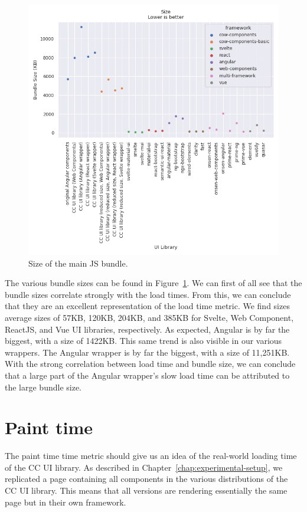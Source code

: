 \begin{figure}[h]
  \includegraphics[width=\columnwidth]{plots/size.png}
  \caption{Size of the main JS bundle.}
  \label{fig:results:size}
  \centering
\end{figure}


The various bundle sizes can be found in Figure~\ref{fig:results:size}. We can first of all see that the bundle sizes correlate strongly with the load times. From this, we can conclude that they are an excellent representation of the load time metric. We find sizes average sizes of 57KB, 120KB, 204KB, and 385KB for Svelte, Web Component, ReactJS, and Vue UI libraries, respectively. As expected, Angular is by far the biggest, with a size of 1422KB. This same trend is also visible in our various wrappers. The Angular wrapper is by far the biggest, with a size of 11,251KB. With the strong correlation between load time and bundle size, we can conclude that a large part of the Angular wrapper's slow load time can be attributed to the large bundle size.

\section{Paint time}
The paint time time metric should give us an idea of the real-world loading time of the CC UI library. As described in Chapter~\ref{chap:experimental-setup}, we replicated a page containing all components in the various distributions of the CC UI library. This means that all versions are rendering essentially the same page but in their own framework.

